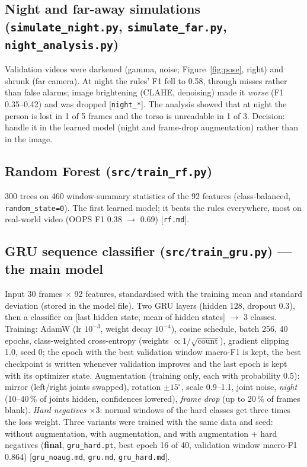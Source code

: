 \documentclass[11pt,a4paper]{article}
\newcommand{\code}[1]{\texttt{\small #1}}
\begin{document}
\subsection{Night and far-away simulations (\code{simulate\_night.py}, \code{simulate\_far.py}, \code{night\_analysis.py})}
Validation videos were darkened (gamma, noise; Figure~\ref{fig:pose}, right) and shrunk (far camera). At night
the rules' F1 fell to 0.58, through misses rather than false alarms; image brightening (CLAHE, denoising)
made it \emph{worse} (F1 0.35--0.42) and was dropped [\code{night\_*}]. The analysis showed that at night the
person is lost in 1 of 5 frames and the torso is unreadable in 1 of 3. Decision: handle it in the learned
model (night and frame-drop augmentation) rather than in the image.

\subsection{Random Forest (\code{src/train\_rf.py})}
300 trees on 460 window-summary statistics of the 92 features (class-balanced, \code{random\_state=0}). The
first learned model; it beats the rules everywhere, most on real-world video (OOPS F1 0.38 $\rightarrow$ 0.69)
[\code{rf.md}].

\subsection{GRU sequence classifier (\code{src/train\_gru.py}) --- the main model}
Input 30 frames $\times$ 92 features, standardised with the training mean and standard deviation (stored in
the model file). Two GRU layers (hidden 128, dropout 0.3), then a classifier on [last hidden state, mean of
hidden states] $\rightarrow$ 3 classes. Training: AdamW (lr $10^{-3}$, weight decay $10^{-4}$), cosine
schedule, batch 256, 40 epochs, class-weighted cross-entropy (weights $\propto 1/\sqrt{\text{count}}$),
gradient clipping 1.0, seed 0; the epoch with the best validation window macro-F1 is kept, the best checkpoint
is written whenever validation improves and the last epoch is kept with its optimizer state. Augmentation
(training only, each with probability 0.5): mirror (left/right joints swapped), rotation $\pm15^\circ$, scale
0.9--1.1, joint noise, \emph{night} (10--40\,\% of joints hidden, confidences lowered), \emph{frame drop} (up to
20\,\% of frames blank). \emph{Hard negatives $\times 3$}: normal windows of the hard classes get three times the
loss weight. Three variants were trained with the same data and seed: without augmentation, with augmentation,
and with augmentation + hard negatives (\textbf{final}, \code{gru\_hard.pt}, best epoch 16 of 40, validation
window macro-F1 0.864) [\code{gru\_noaug.md}, \code{gru.md}, \code{gru\_hard.md}].
\end{document}
